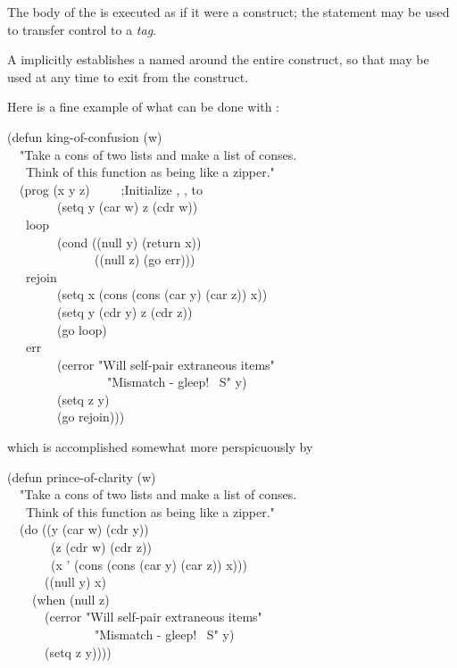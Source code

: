 \begin{defmac}
The body of the  is executed as if it were a 
construct; the  statement may be used to transfer control
to a \textit{tag}.

A  implicitly establishes a  named {\nil} around
the entire  construct, so that  may be used
at any time to exit from the  construct.

Here is a fine example of what can be done with :
\begin{lisp}
(defun king-of-confusion (w) \\
~~"Take a cons of two lists and make a list of conses. \\
~~~Think of this function as being like a zipper." \\
~~(prog (x y z)~~~~~;{\rm Initialize , ,  to {\false}} \\
~~~~~~~~(setq y (car w) z (cdr w)) \\
~~~loop \\
~~~~~~~~(cond ((null y) (return x)) \\
~~~~~~~~~~~~~~((null z) (go err))) \\
~~~rejoin \\
~~~~~~~~(setq x (cons (cons (car y) (car z)) x)) \\
~~~~~~~~(setq y (cdr y) z (cdr z)) \\
~~~~~~~~(go loop) \\
~~~err \\
~~~~~~~~(cerror "Will self-pair extraneous items" \\
~~~~~~~~~~~~~~~~"Mismatch - gleep!  ~S" y) \\
~~~~~~~~(setq z y) \\
~~~~~~~~(go rejoin)))
\end{lisp}
which is accomplished somewhat more perspicuously by
\begin{lisp}
(defun prince-of-clarity (w) \\
~~"Take a cons of two lists and make a list of conses. \\
~~~Think of this function as being like a zipper." \\
~~(do ((y (car w) (cdr y)) \\
~~~~~~~(z (cdr w) (cdr z)) \\
~~~~~~~(x '{\emptylist} (cons (cons (car y) (car z)) x))) \\
~~~~~~((null y) x) \\
~~~~(when (null z) \\
~~~~~~(cerror "Will self-pair extraneous items" \\
~~~~~~~~~~~~~~"Mismatch - gleep!  ~S" y) \\
~~~~~~(setq z y))))
\end{lisp}


\end{defmac}
